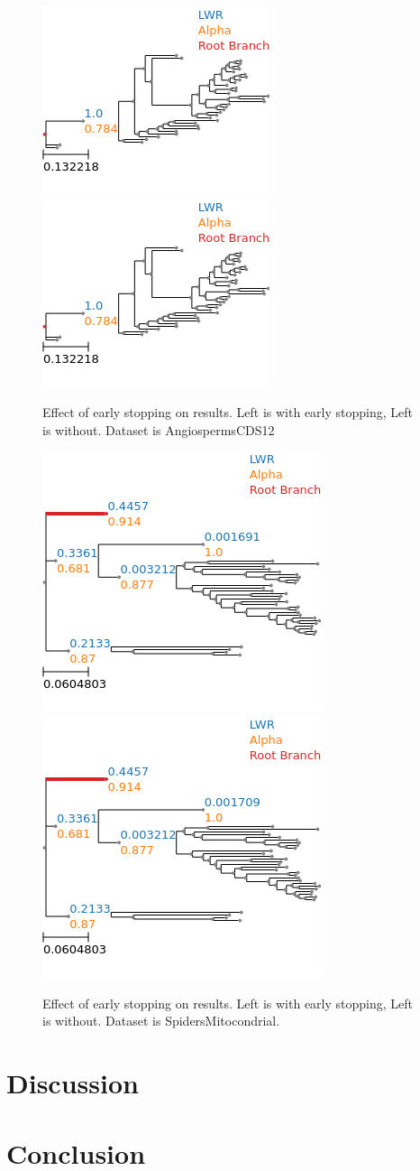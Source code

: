 \documentclass{article}
\begin{document}
\begin{figure}[H]
  \begin{center}
    \includegraphics[width=.3\linewidth]{figs/early_stop_tests/es_test_cds12_no_outgroup.png}
    \includegraphics[width=.3\linewidth]{figs/early_stop_tests/es_test_cds12_no_outgroup_noes.png}
    \caption{Effect of early stopping on results. Left is with early stopping,
    Left is without. Dataset is AngiospermsCDS12}
  \end{center}
\end{figure}
\begin{figure}[H]
  \begin{center}
    \includegraphics[width=.3\linewidth]{figs/early_stop_tests/es_test_mito_no_outgroup.png}
    \includegraphics[width=.3\linewidth]{figs/early_stop_tests/es_test_mito_no_outgroup_noes.png}
    \caption{Effect of early stopping on results. Left is with early stopping,
    Left is without. Dataset is SpidersMitocondrial.}
  \end{center}
\end{figure}

\section{Discussion}

\section{Conclusion}



\end{document}
